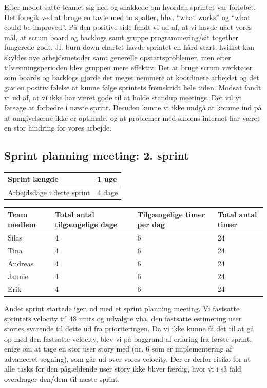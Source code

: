 \documentclass[12pt, a4paper]{report}
\begin{document}
Efter mødet satte teamet sig ned og snakkede om hvordan sprintet var forløbet. Det foregik ved at bruge en tavle med to spalter, hhv. “what works” og “what could be improved”. På den positive side fandt vi ud af, at vi havde nået vores mål, at scrum board og backlogs samt gruppe programmering/sit together fungerede godt. Jf. burn down chartet havde sprintet en hård start, hvilket kan skyldes nye arbejdsmetoder samt generelle opstartsproblemer, men efter tilvænningsperioden blev gruppen mere effektiv. Det at bruge scrum værktøjer som boards og backlogs gjorde det meget nemmere at koordinere arbejdet og det gav en positiv følelse at kunne følge sprintets fremskridt hele tiden. Modsat fandt vi ud af, at vi ikke har været gode til at holde standup meetings. Det vil vi førsøge at forbedre i næste sprint. Desuden kunne vi ikke undgå at komme ind på at omgivelserne ikke er optimale, og at problemer med skolens internet har været en stor hindring for vores arbejde.

\subsection{Sprint planning meeting: 2. sprint}

\begin{tabular}{| l | l |}

\hline
Sprint længde & 1 uge \\ \hline
Arbejdsdage i dette sprint & 4 dage \\
\hline
\end{tabular}

\begin{tabular}{| p{4cm} | p{4cm} | p{4cm} | p{4cm} |}
\hline
Team medlem & Total antal tilgængelige dage & Tilgængelige timer per dag & Total antal timer \\ \hline
Silas & 4 & 6 & 24 \\ \hline
Tina & 4 & 6 & 24 \\ \hline
Andreas & 4 & 6 & 24 \\ \hline
Jannie & 4 & 6 & 24 \\ \hline
Erik & 4 & 6 & 24 \\
\hline
\end{tabular}

Andet sprint startede igen ud med et sprint planning meeting. Vi fastsatte sprintets velocity til 48 units og udvalgte vha. den fastsatte estimering user stories svarende til dette ud fra prioriteringen. Da vi ikke kunne få det til at gå op med den fastsatte velocity, blev vi på baggrund af erfaring fra første sprint, enige om at tage en stor user story med (nr. 6 som er implementering af advanceret søgning), som går ud over vores velocity. Der er derfor risiko for at alle tasks for den pågældende user story ikke bliver færdig, hvor vi i så fald overdrager den/dem til næste sprint.
\end{document}
